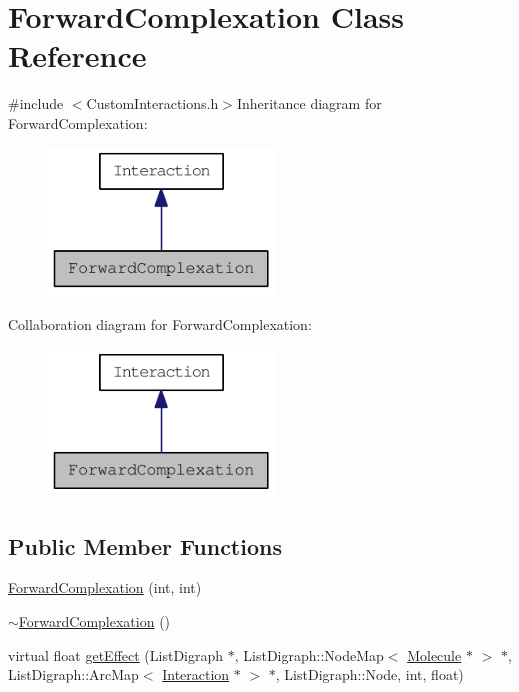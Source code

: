\hypertarget{classForwardComplexation}{
\section{ForwardComplexation Class Reference}
\label{classForwardComplexation}
}


{\ttfamily \#include $<$CustomInteractions.h$>$}Inheritance diagram for ForwardComplexation:\nopagebreak
\begin{figure}[H]
\begin{center}
\leavevmode
\includegraphics[width=170pt]{classForwardComplexation__inherit__graph}
\end{center}
\end{figure}
Collaboration diagram for ForwardComplexation:\nopagebreak
\begin{figure}[H]
\begin{center}
\leavevmode
\includegraphics[width=170pt]{classForwardComplexation__coll__graph}
\end{center}
\end{figure}
\subsection*{Public Member Functions}
\begin{DoxyCompactItemize}
\item 
\hyperlink{classForwardComplexation_a0ab16d0c2ad4bef757d811d4b7fd9682}{ForwardComplexation} (int, int)
\item 
\hyperlink{classForwardComplexation_afd5c904c0ae1842caa2e26162300d2ff}{$\sim$ForwardComplexation} ()
\item 
virtual float \hyperlink{classForwardComplexation_a8f7f867b98b484ed0f09192ebd280e1a}{getEffect} (ListDigraph $\ast$, ListDigraph::NodeMap$<$ \hyperlink{classMolecule}{Molecule} $\ast$ $>$ $\ast$, ListDigraph::ArcMap$<$ \hyperlink{classInteraction}{Interaction} $\ast$ $>$ $\ast$, ListDigraph::Node, int, float)
\end{DoxyCompactItemize}

